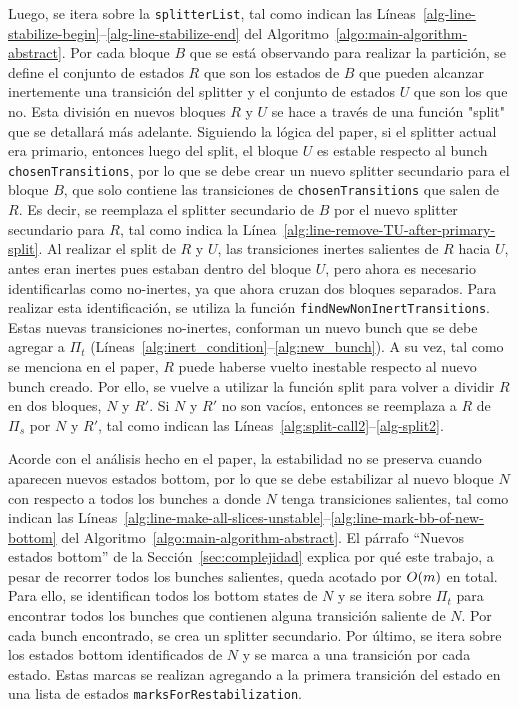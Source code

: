 Luego, se itera sobre la \texttt{splitterList}, tal como indican las Líneas~\ref{alg-line-stabilize-begin}--\ref{alg-line-stabilize-end} del Algoritmo~\ref{algo:main-algorithm-abstract}. Por cada bloque $B$ que se está observando para realizar la partición, se define el conjunto de estados $R$ que son los estados de $B$ que pueden alcanzar inertemente una transición del splitter y el conjunto de estados $U$ que son los que no. Esta división en nuevos bloques $R$ y $U$ se hace a través de una función "split" que se detallará más adelante. Siguiendo la lógica del paper, si el splitter actual era primario, entonces luego del split, el bloque $U$ es estable respecto al bunch \texttt{chosenTransitions}, por lo que se debe crear un nuevo splitter secundario para el bloque $B$, que solo contiene las transiciones de \texttt{chosenTransitions} que salen de $R$. Es decir, se reemplaza el splitter secundario de $B$ por el nuevo splitter secundario para $R$, tal como indica la Línea~\ref{alg:line-remove-TU-after-primary-split}. Al realizar el split de $R$ y $U$, las transiciones inertes salientes de $R$ hacia $U$, antes eran inertes pues estaban dentro del bloque $U$, pero ahora es necesario identificarlas como no-inertes, ya que ahora cruzan dos bloques separados. Para realizar esta identificación, se utiliza la función \texttt{findNewNonInertTransitions}. Estas nuevas transiciones no-inertes, conforman un nuevo bunch que se debe agregar a $\Pi_t$ (Líneas~\ref{alg:inert_condition}--\ref{alg:new_bunch}). A su vez, tal como se menciona en el paper, $R$ puede haberse vuelto inestable respecto al nuevo bunch creado. Por ello, se vuelve a utilizar la función split para volver a dividir $R$ en dos bloques, $N$ y $R'$. Si $N$ y $R'$ no son vacíos, entonces se reemplaza a $R$ de $\Pi_s$ por $N$ y $R'$, tal como indican las Líneas~\ref{alg:split-call2}--\ref{alg-split2}.

Acorde con el análisis hecho en el paper, la estabilidad no se preserva cuando aparecen nuevos estados bottom, por lo que se debe estabilizar al nuevo bloque $N$ con respecto a todos los bunches a donde $N$ tenga transiciones salientes, tal como indican las Líneas~\ref{alg:line-make-all-slices-unstable}--\ref{alg:line-mark-bb-of-new-bottom} del Algoritmo~\ref{algo:main-algorithm-abstract}. El párrafo ``Nuevos estados bottom'' de la Sección~\ref{sec:complejidad} explica por qué este trabajo, a pesar de recorrer todos los bunches salientes, queda acotado por ${O\!\left(m\right)}$ en total. Para ello, se identifican todos los bottom states de $N$ y se itera sobre $\Pi_t$ para encontrar todos los bunches que contienen alguna transición saliente de $N$. Por cada bunch encontrado, se crea un splitter secundario. Por último, se itera sobre los estados bottom identificados de $N$ y se marca a una transición por cada estado. Estas marcas se realizan agregando a la primera transición del estado en una lista de estados \texttt{marksForRestabilization}.

